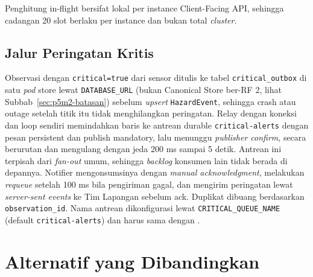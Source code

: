 Penghitung in-flight bersifat lokal per instance Client-Facing API, sehingga cadangan 20 slot berlaku per instance dan bukan total \textit{cluster}.

\subsection{Jalur Peringatan Kritis}

Observasi dengan \texttt{critical=true} dari sensor ditulis ke tabel \texttt{critical\_outbox} di satu \textit{pod} store lewat \texttt{DATABASE\_URL} (bukan Canonical Store ber-RF 2, lihat Subbab~\ref{sec:p5m2-batasan}) sebelum \textit{upsert} \texttt{HazardEvent}, sehingga crash atau outage setelah titik itu tidak menghilangkan peringatan. Relay dengan koneksi dan loop sendiri memindahkan baris ke antrean durable \texttt{critical-alerts} dengan pesan persistent dan publish mandatory, lalu menunggu \textit{publisher confirm}, secara berurutan dan mengulang dengan jeda 200 ms sampai 5 detik. Antrean ini terpisah dari \textit{fan-out} umum, sehingga \textit{backlog} konsumen lain tidak berada di depannya. Notifier mengonsumsinya dengan \textit{manual acknowledgment}, melakukan \textit{requeue} setelah 100 ms bila pengiriman gagal, dan mengirim peringatan lewat \textit{server-sent events} ke Tim Lapangan sebelum ack. Duplikat dibuang berdasarkan \texttt{observation\_id}. Nama antrean dikonfigurasi lewat \texttt{CRITICAL\_QUEUE\_NAME} (default \texttt{critical-alerts}) dan harus sama dengan .

\section{Alternatif yang Dibandingkan}

